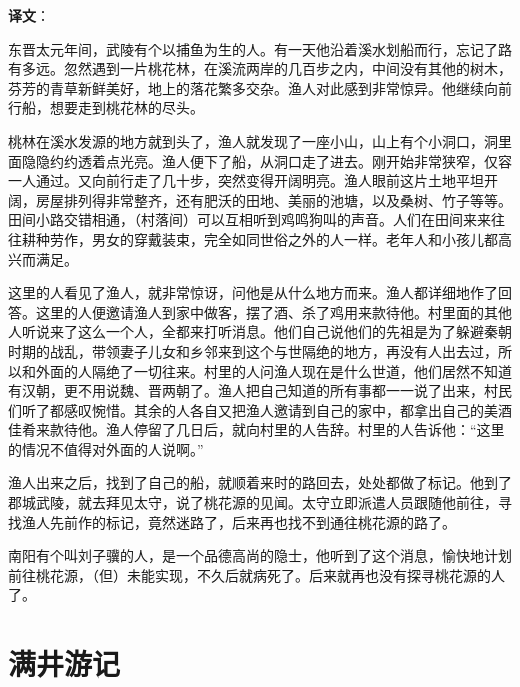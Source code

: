 \documentclass[12pt,UTF-8,openany,a4]{ctexbook}
\begin{document}
\newpage

\begin{Large}
   \noindent \textbf{译文}：
\end{Large}

\vspace{1em}

\begin{large}\yiwen
    
    东晋太元年间，武陵有个以捕鱼为生的人。有一天他沿着溪水划船而行，忘记了路有多远。忽然遇到一片桃花林，在溪流两岸的几百步之内，中间没有其他的树木， 芬芳的青草新鲜美好，地上的落花繁多交杂。渔人对此感到非常惊异。他继续向前行船，想要走到桃花林的尽头。
    
    桃林在溪水发源的地方就到头了，渔人就发现了一座小山，山上有个小洞口，洞里面隐隐约约透着点光亮。渔人便下了船，从洞口走了进去。刚开始非常狭窄，仅容一人通过。又向前行走了几十步，突然变得开阔明亮。渔人眼前这片土地平坦开阔，房屋排列得非常整齐，还有肥沃的田地、美丽的池塘，以及桑树、竹子等等。田间小路交错相通，（村落间）可以互相听到鸡鸣狗叫的声音。人们在田间来来往往耕种劳作，男女的穿戴装束，完全如同世俗之外的人一样。老年人和小孩儿都高兴而满足。
    
    这里的人看见了渔人，就非常惊讶，问他是从什么地方而来。渔人都详细地作了回答。这里的人便邀请渔人到家中做客，摆了酒、杀了鸡用来款待他。村里面的其他人听说来了这么一个人，全都来打听消息。他们自己说他们的先祖是为了躲避秦朝时期的战乱，带领妻子儿女和乡邻来到这个与世隔绝的地方，再没有人出去过，所以和外面的人隔绝了一切往来。村里的人问渔人现在是什么世道，他们居然不知道有汉朝，更不用说魏、晋两朝了。渔人把自己知道的所有事都一一说了出来，村民们听了都感叹惋惜。其余的人各自又把渔人邀请到自己的家中，都拿出自己的美酒佳肴来款待他。渔人停留了几日后，就向村里的人告辞。村里的人告诉他：“这里的情况不值得对外面的人说啊。”
    
    渔人出来之后，找到了自己的船，就顺着来时的路回去，处处都做了标记。他到了郡城武陵，就去拜见太守，说了桃花源的见闻。太守立即派遣人员跟随他前往，寻找渔人先前作的标记，竟然迷路了，后来再也找不到通往桃花源的路了。
    
    南阳有个叫刘子骥的人，是一个品德高尚的隐士，他听到了这个消息，愉快地计划前往桃花源，（但）未能实现，不久后就病死了。后来就再也没有探寻桃花源的人了。
    

\end{large}



\chapter{满井游记}
\end{document}
